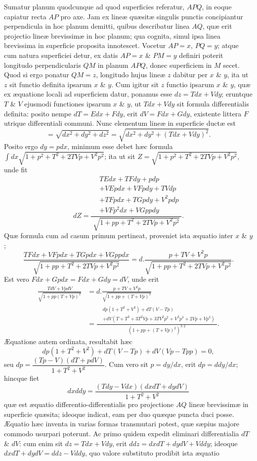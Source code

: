 Sumatur planum quodcunque ad quod superficies referatur, $APQ$, in eoque capiatur recta $AP$ pro axe. Jam ex lineæ quæsitæ singulis punctis concipiantur perpendicula in hoc planum demitti, quibus describatur linea $AQ$, quæ erit projectio lineæ brevissimæ in hoc planum; qua cognita, simul ipsa linea brevissima in superficie proposita innotescet. Vocetur $AP=x$, $PQ=y$; atque cum natura superficiei detur, ex datis $AP=x$ \& $PM=y$ definiri poterit longitudo perpendicularis $QM$ in planum $APQ$, donec superficiem in $M$ secet. Quod si ergo ponatur $QM=z$, longitudo hujus lineæ $z$ dabitur per $x$ \& $y$, ita ut $z$ sit functio definita ipsarum $x$ \& $y$. Cum igitur sit $z$ functio ipsarum $x$ \& $y$, quæ ex æquatione locali ad superficiem datur, ponamus esse $dz=Tdx+Vdy$; eruntque $T$ \& $V$ ejusmodi functiones ipsarum $x$ \& $y$, ut $Tdx+Vdy$ sit formula differentialis definita: posito nempe $dT=Edx+Fdy$, erit $dV=Fdx+Gdy$, existente littera $F$ utrique differentiali communi. Nunc elementum lineæ in superficie ductæ est
\[=\sqrt{dx^2+dy^2+dz^2}=\sqrt{dx^2+dy^2+(Tdx+Vdy)^2}.\]
Posito ergo $dy=pdx$, minimum esse debet hæc formula $\int dx\sqrt{1+p^2+T^2+2TVp+V^2p^2}$; ita ut sit $Z=\sqrt{1+p^2+T^2+2TVp+V^2p^2}$, unde fit
\[
dZ=\frac{\begin{aligned}&TEdx+TFdy+pdp\\&+VEpdx+VF pdy+TVdp\\&+TFpdx+TGpdy+V^2pdp\\&+VF p^2dx+VGppdy\end{aligned}}{\sqrt{1+pp+T^2+2TVp+V^2p^2}}.
\]
Quæ formula cum ad casum primum pertineat, proveniet ista æquatio inter $x$ \& $y$;
\[\frac{TFdx+VF pdx+TGpdx+VGppdx}{\sqrt{1+pp+T^2+2TVp+V^2p^2}}=d.\frac{p+TV+V^2p}{\sqrt{1+pp+T^2+2TVp+V^2p^2}}.\]
Est vero $Fdx+Gpdx=Fdx+Gdy=dV$, unde erit
\[\begin{aligned}\frac{TdV+VpdV}{\sqrt{1+pp(T+Vp)^2}}&=d.\frac{p+TV+V^2p}{\sqrt{1+pp+(T+Vp)^2}}\\&=\frac{\begin{aligned}&dp(1+T^2+V^2)+dT(V-Tp)\\&+dV(T+T^3+3T^2Vp+3TV^2p^2+V^3p^3+2Vp+Vp^3)\end{aligned}}{(1+pp+(T+Vp)^2)^{3:2}}.\end{aligned}\]
Æquatione autem ordinata, resultabit hæc
\[dp(1+T^2+V^2)+dT(V-Tp)+dV(Vp-Tpp)=0,\]
seu $dp=\dfrac{(Tp-V)(dT+pdV)}{1+T^2+V^2}$. Cum vero sit $p=dy/dx$, erit $dp=ddy/dx$; hincque fiet
\[dxddy=\frac{(Tdy-Vdx)(dxdT+dydV)}{1+T^2+V^2}\]
quæ est æquatio differentio-differentialis pro projectione $AQ$ lineæ brevissimæ in superficie quæsita; ideoque indicat, eam per duo quæque puncta duci posse. Æquatio hæc inventa in varias formas transmutari potest, quæ sæpius majore commodo usurpari poterunt. Ac primo quidem expedit eliminari differentialia $dT$ \& $dV$: cum enim sit $dz=Tdx+Vdy$, erit $ddz=dxdT+dydV+Vddy$; ideoque $dxdT+dydV=ddz-Vddy$, quo valore substituto prodibit ista æquatio
